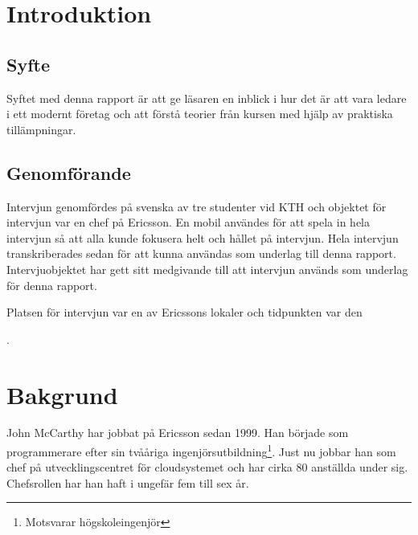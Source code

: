 \section{Introduktion}
\subsection{Syfte}
Syftet med denna rapport är att ge läsaren en inblick i hur det är att vara ledare i ett modernt företag och att förstå teorier från kursen med hjälp av praktiska tillämpningar.

\subsection{Genomförande}
Intervjun genomfördes på svenska av tre studenter vid KTH och objektet för intervjun var en chef på Ericsson. En mobil användes för att spela in hela intervjun så att alla kunde fokusera helt och hållet på intervjun. Hela intervjun transkriberades sedan för att kunna användas som underlag till denna rapport. Intervjuobjektet har gett sitt medgivande till att intervjun används som underlag för denna rapport.

Platsen för intervjun var en av Ericssons lokaler och tidpunkten var den \date{28 april, 2014}.

\section{Bakgrund}
\label{sec:bakgrund}

John McCarthy har jobbat på Ericsson sedan 1999. Han började som programmerare efter sin tvååriga ingenjörsutbildning\footnote{Motsvarar högskoleingenjör}. Just nu jobbar han som chef på utvecklingscentret för cloudsystemet och har cirka 80 anställda under sig. Chefsrollen har han haft i ungefär fem till sex år.